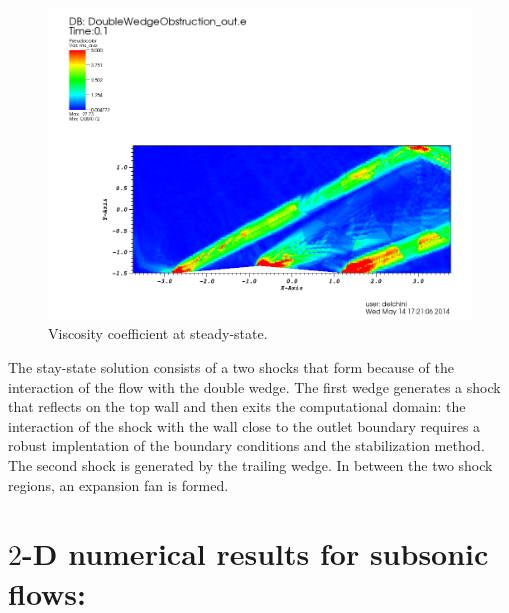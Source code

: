 %
        \begin{figure}[H]%
                \centering
                \includegraphics[scale=.50]{figures/DWOViscosityStt.png}
                \caption{Viscosity coefficient at steady-state.}
                \label{fig:2d_dbw_visc_stt}
        \end{figure}
The stay-state solution consists of a two shocks that form because of the interaction of the flow with the double wedge. The first wedge generates a shock that reflects on the top wall and then exits the computational domain: the interaction of the shock with the wall close to the outlet boundary requires a robust implentation of the boundary conditions and the stabilization method. The second shock is generated by the trailing wedge. In between the two shock regions, an expansion fan is formed. 
\section{$2$-D numerical results for subsonic flows:} \label{sec:2d-susubsonic-results}
